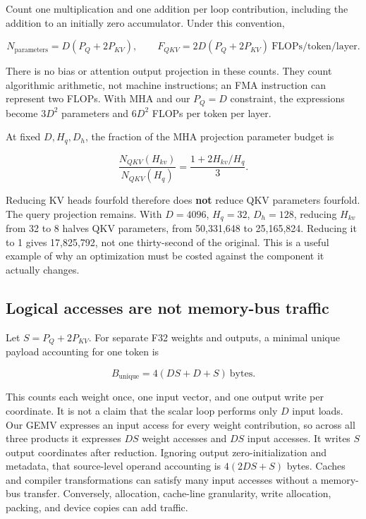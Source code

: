 
Count one multiplication and one addition per loop contribution,
including the addition to an initially zero accumulator. Under this
convention,

\begin{equation}
N_{\mathrm{parameters}}=D(P_Q+2P_{KV}),\qquad
F_{QKV}=2D(P_Q+2P_{KV})\ \text{FLOPs/token/layer}.
\end{equation}

There is no bias or attention output projection in these counts. They
count algorithmic arithmetic, not machine instructions; an FMA
instruction can represent two FLOPs. With MHA and our \(P_Q=D\)
constraint, the expressions become \(3D^2\) parameters and \(6D^2\)
FLOPs per token per layer.

At fixed \(D,H_q,D_h\), the fraction of the MHA projection parameter
budget is

\begin{equation}
\frac{N_{QKV}(H_{kv})}{N_{QKV}(H_q)}
=\frac{1+2H_{kv}/H_q}{3}.
\end{equation}

Reducing KV heads fourfold therefore does \textbf{not} reduce QKV
parameters fourfold. The query projection remains. With \(D=4096\),
\(H_q=32\), \(D_h=128\), reducing \(H_{kv}\) from 32 to 8 halves QKV
parameters, from 50,331,648 to 25,165,824. Reducing it to 1 gives
17,825,792, not one thirty-second of the original. This is a useful
example of why an optimization must be costed against the component it
actually changes.

\subsection{Logical accesses are not memory-bus
traffic}\label{logical-accesses-are-not-memory-bus-traffic}

Let \(S=P_Q+2P_{KV}\). For separate F32 weights and outputs, a minimal
unique payload accounting for one token is

\begin{equation}
B_{\mathrm{unique}}=4(DS+D+S)\ \text{bytes}.
\end{equation}

This counts each weight once, one input vector, and one output write per
coordinate. It is not a claim that the scalar loop performs only \(D\)
input loads. Our GEMV expresses an input access for every weight
contribution, so across all three products it expresses \(DS\) weight
accesses and \(DS\) input accesses. It writes \(S\) output coordinates
after reduction. Ignoring output zero-initialization and metadata, that
source-level operand accounting is \(4(2DS+S)\) bytes. Caches and
compiler transformations can satisfy many input accesses without a
memory-bus transfer. Conversely, allocation, cache-line granularity,
write allocation, packing, and device copies can add traffic.

